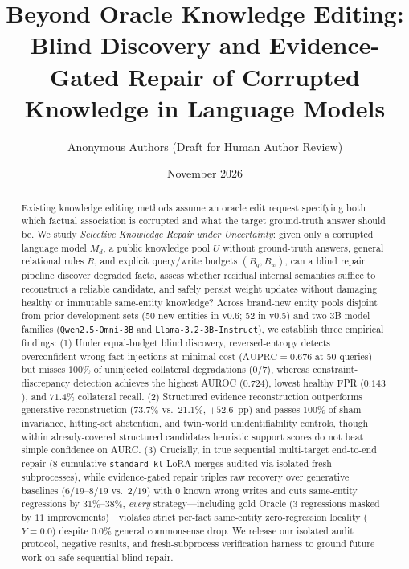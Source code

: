 \documentclass[11pt]{article}
\title{Beyond Oracle Knowledge Editing: Blind Discovery and Evidence-Gated Repair of Corrupted Knowledge in Language Models}
\author{Anonymous Authors (Draft for Human Author Review)}
\date{November 2026}
\begin{document}
\maketitle

\begin{abstract}
Existing knowledge editing methods assume an oracle edit request specifying both which factual association is corrupted and what the target ground-truth answer should be. We study \emph{Selective Knowledge Repair under Uncertainty}: given only a corrupted language model $M_d$, a public knowledge pool $U$ without ground-truth answers, general relational rules $R$, and explicit query/write budgets $(B_q, B_w)$, can a blind repair pipeline discover degraded facts, assess whether residual internal semantics suffice to reconstruct a reliable candidate, and safely persist weight updates without damaging healthy or immutable same-entity knowledge? Across brand-new entity pools disjoint from prior development sets (50 new entities in v0.6; 52 in v0.5) and two 3B model families (\texttt{Qwen2.5-Omni-3B} and \texttt{Llama-3.2-3B-Instruct}), we establish three empirical findings: (1) Under equal-budget blind discovery, reversed-entropy detects overconfident wrong-fact injections at minimal cost ($\text{AUPRC}=0.676$ at 50 queries) but misses $100\%$ of uninjected collateral degradations ($0/7$), whereas constraint-discrepancy detection achieves the highest AUROC ($0.724$), lowest healthy FPR ($0.143$), and $71.4\%$ collateral recall. (2) Structured evidence reconstruction outperforms generative reconstruction ($73.7\%$ vs.\ $21.1\%$, $+52.6$~pp) and passes $100\%$ of sham-invariance, hitting-set abstention, and twin-world unidentifiability controls, though within already-covered structured candidates heuristic support scores do not beat simple confidence on AURC. (3) Crucially, in true sequential multi-target end-to-end repair ($8$ cumulative \texttt{standard\_kl} LoRA merges audited via isolated fresh subprocesses), while evidence-gated repair triples raw recovery over generative baselines ($6/19$--$8/19$ vs.\ $2/19$) with $0$ known wrong writes and cuts same-entity regressions by $31\%$--$38\%$, \emph{every} strategy---including gold Oracle ($3$ regressions masked by $11$ improvements)---violates strict per-fact same-entity zero-regression locality ($Y=0.0$) despite $0.0\%$ general commonsense drop. We release our isolated audit protocol, negative results, and fresh-subprocess verification harness to ground future work on safe sequential blind repair.
\end{abstract}
\end{document}
